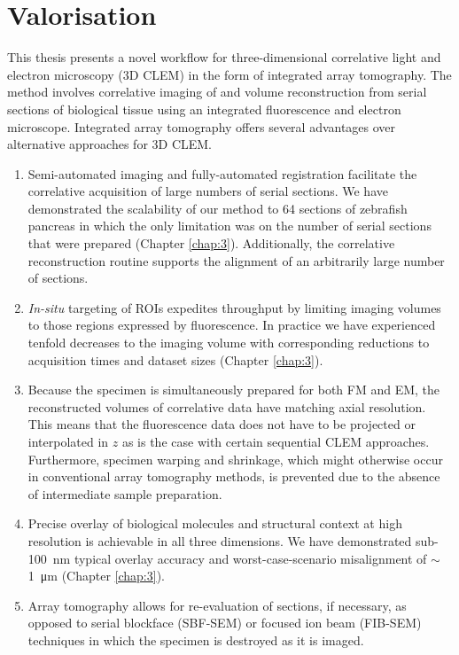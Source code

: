 \section{Valorisation}
\label{sec:5.1_valorisation}

This thesis presents a novel workflow for three-dimensional correlative light and electron microscopy (3D CLEM) in the form of integrated array tomography. The method involves correlative imaging of and volume reconstruction from serial sections of biological tissue using an integrated fluorescence and electron microscope. Integrated array tomography offers several advantages over alternative approaches for 3D CLEM.

\begin{enumerate}[label=(\Roman*)]
    \item Semi-automated imaging and fully-automated registration facilitate the correlative acquisition of large numbers of serial sections. We have demonstrated the scalability of our method to 64 sections of zebrafish pancreas in which the only limitation was on the number of serial sections that were prepared (Chapter \ref{chap:3}). Additionally, the correlative reconstruction routine supports the alignment of an arbitrarily large number of sections.
    \item \textit{In-situ} targeting of ROIs expedites throughput by limiting imaging volumes to those regions expressed by fluorescence. In practice we have experienced tenfold decreases to the imaging volume with corresponding reductions to acquisition times and dataset sizes (Chapter \ref{chap:3}).
    \item Because the specimen is simultaneously prepared for both FM and EM, the reconstructed volumes of correlative data have matching axial resolution. This means that the fluorescence data does not have to be projected or interpolated in $z$ as is the case with certain sequential CLEM approaches. Furthermore, specimen warping and shrinkage, which might otherwise occur in conventional array tomography methods, is prevented due to the absence of intermediate sample preparation.
    \item Precise overlay of biological molecules and structural context at high resolution is achievable in all three dimensions. We have demonstrated sub-\SI{100}{\nano\meter} typical overlay accuracy and worst-case-scenario misalignment of ${\sim}$\SI{1}{\micro\meter} (Chapter \ref{chap:3}).
    \item Array tomography allows for re-evaluation of sections, if necessary, as opposed to serial blockface (SBF-SEM) or focused ion beam (FIB-SEM) techniques in which the specimen is destroyed as it is imaged.
\end{enumerate}

